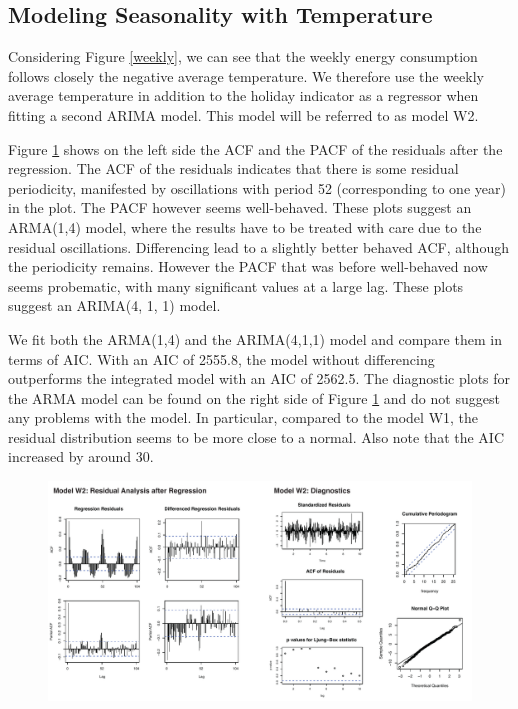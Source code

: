 \documentclass[conference]{IEEEtran}
\begin{document}
\subsection{Modeling Seasonality with Temperature}
Considering Figure \ref{weekly}, we can see that the weekly energy consumption follows closely the negative average temperature. We therefore use the weekly average temperature in addition to the holiday indicator as a regressor when fitting a second ARIMA model. This model will be referred to as model W2.
\par
Figure \ref{weekly_mod2} shows on the left side the ACF and the PACF of the residuals after the regression. The ACF of the residuals indicates that there is some residual periodicity, manifested by oscillations with period 52 (corresponding to one year) in the plot. The PACF however seems well-behaved. These plots suggest an ARMA(1,4) model, where the results have to be treated with care due to the residual oscillations. Differencing lead to a slightly better behaved ACF, although the periodicity remains. However the PACF that was before well-behaved now seems probematic, with many significant values at a large lag. These plots suggest an ARIMA(4, 1, 1) model.
\par
We fit both the ARMA(1,4) and the ARIMA(4,1,1) model and compare them in terms of AIC. With an AIC of 2555.8, the model without differencing outperforms the integrated model with an AIC of 2562.5. The diagnostic plots for the ARMA model can be found on the right side of Figure \ref{weekly_mod2} and do not suggest any problems with the model. In particular, compared to the model W1, the residual distribution seems to be more close to a normal. Also note that the AIC increased by around 30. 

\begin{figure}[ht]
	\centering
	\includegraphics[width=1\textwidth]{Figs/Fig4.pdf}
	\caption{}
	\label{weekly_mod2}
\end{figure}
\end{document}
